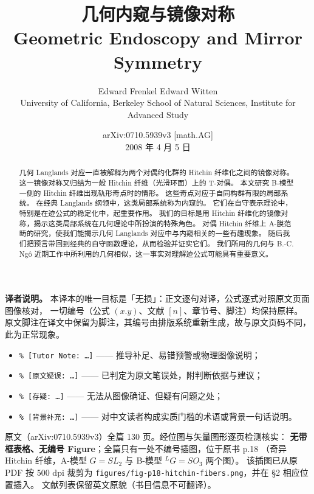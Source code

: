 \documentclass[11pt,a4paper]{article}
\begin{document}
\title{\bfseries 几何内窥与镜像对称\\[0.6em]
       \large Geometric Endoscopy and Mirror Symmetry}
\author{Edward Frenkel \quad Edward Witten\\[0.3em]
        \small University of California, Berkeley \quad
        School of Natural Sciences, Institute for Advanced Study}
\date{\small arXiv:0710.5939v3 [math.AG]\\[0.2em]
      \small 2008 年 4 月 5 日}
\maketitle

\begin{abstract}
\noindent
几何 Langlands 对应一直被解释为两个对偶约化群的 Hitchin 纤维化之间的镜像对称。
这一镜像对称又归结为一般 Hitchin 纤维（光滑环面）上的 T-对偶。
本文研究 B-模型一侧的 Hitchin 纤维出现轨形奇点时的情形。
这些奇点对应于自同构群有限的局部系统。
在经典 Langlands 纲领中，这类局部系统称为内窥的。
它们在自守表示理论中，特别是在迹公式的稳定化中，起重要作用。
我们的目标是用 Hitchin 纤维化的镜像对称，揭示这类局部系统在几何理论中所扮演的特殊角色。
对偶 Hitchin 纤维上 A-膜范畴的研究，使我们能揭示几何 Langlands 对应中与内窥相关的一些有趣现象。
随后我们把预言带回到经典的自守函数理论，从而检验并证实它们。
我们所用的几何与 B.-C. Ngô 近期工作中所利用的几何相似，这一事实对理解迹公式可能具有重要意义。
\end{abstract}

\begin{translatornote}
\textbf{译者说明。}
本译本的唯一目标是「无损」：正文逐句对译，公式逐式对照原文页面图像核对，
一切编号（公式 $(x.y)$、文献 $[n]$、章节号、脚注）均保持原样。
原文脚注在译文中保留为脚注，其编号由排版系统重新生成，故与原文页码不同，此为正常现象。

\begin{itemize}[leftmargin=2em,itemsep=1pt,topsep=2pt]
\item \texttt{\% [Tutor Note: \dots]} —— 推导补足、易错预警或物理图像说明；
\item \texttt{\% [原文疑误: \dots]} —— 已判定为原文笔误处，附判断依据与建议；
\item \texttt{\% [存疑: \dots]} —— 无法从图像确证、但疑有问题之处；
\item \texttt{\% [背景补充: \dots]} —— 对中文读者构成实质门槛的术语或背景一句话说明。
\end{itemize}

原文（arXiv:0710.5939v3）全篇 130 页。经位图与矢量图形逐页检测核实：
\textbf{无带框表格、无编号 Figure}；全篇只有一处不编号插图，位于原书 p.18
（奇异 Hitchin 纤维，A-模型 $G=SL_2$ 与 B-模型 ${}^{L}G=SO_3$ 两个图）。
该插图已从原 PDF 按 500 dpi 裁剪为 \texttt{figures/fig-p18-hitchin-fibers.png}，并在 §2 相应位置插入。
文献列表保留英文原貌（书目信息不可翻译）。
\end{translatornote}
\end{document}
